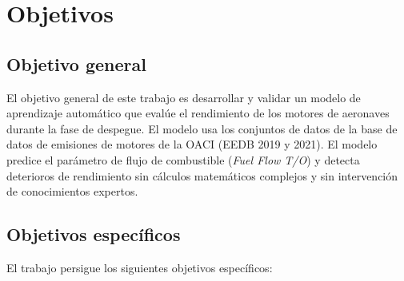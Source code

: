 \chapter{Objetivos}

\section{Objetivo general}

El objetivo general de este trabajo es desarrollar y validar un modelo de aprendizaje automático que evalúe el rendimiento de los motores de aeronaves durante la fase de despegue. El modelo usa los conjuntos de datos de la base de datos de emisiones de motores de la OACI (EEDB 2019 y 2021). El modelo predice el parámetro de flujo de combustible (\textit{Fuel Flow T/O}) y detecta deterioros de rendimiento sin cálculos matemáticos complejos y sin intervención de conocimientos expertos.

\section{Objetivos específicos}

El trabajo persigue los siguientes objetivos específicos:

